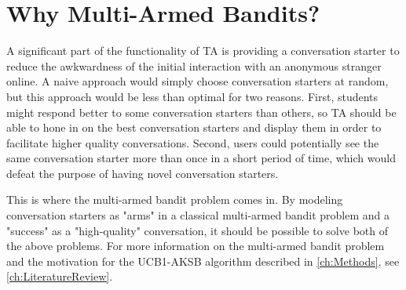 \section{Why Multi-Armed Bandits?}
\label{sec:WhyMultiArmedBandits}
A significant part of the functionality of TA is providing a conversation starter to reduce the awkwardness of the initial interaction with an anonymous stranger online. A naive approach would simply choose conversation starters at random, but this approach would be less than optimal for two reasons. First, students might respond better to some conversation starters than others, so TA should be able to hone in on the best conversation starters and display them in order to facilitate higher quality conversations. Second, users could potentially see the same conversation starter more than once in a short period of time, which would defeat the purpose of having novel conversation starters.

This is where the multi-armed bandit problem comes in. By modeling conversation starters as "arms" in a classical multi-armed bandit problem and a "success" as a "high-quality" conversation, it should be possible to solve both of the above problems. For more information on the multi-armed bandit problem and the motivation for the UCB1-AKSB algorithm described in \autoref{ch:Methods}, see \autoref{ch:LiteratureReview}.
